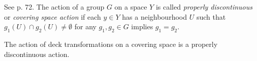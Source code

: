 \begin{definition}
\label{definition-properly-discontinuous-action}
See \cite{hat} p. 72. The action of a group $G$ on a space $Y$ is called 
{\it properly discontinuous} or {\it covering space action} if each $y \in Y$
has a neighbourhood $U$ such that $g_1(U) \cap g_2(U)\neq \emptyset$ for any
$g_1,g_2 \in G$ implies $g_1=g_2$.
\end{definition}

\begin{proposition}
\label{proposition-deck-transformations-act-properly-discontinuous}
The action of deck transformations on a covering space is a properly
discontinuous action.
\end{proposition}







